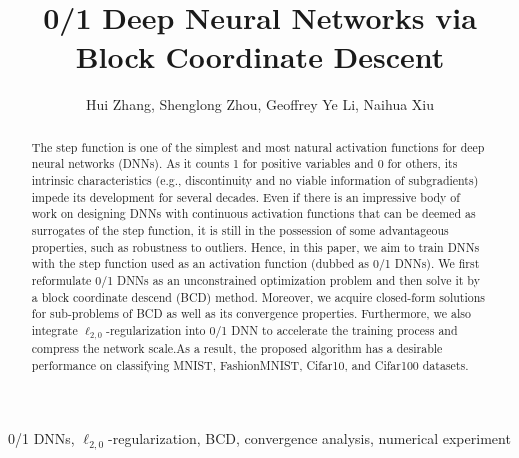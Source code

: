 \documentclass[journal]{IEEEtran}
\begin{document}
\title{\huge 0/1 Deep Neural Networks via Block Coordinate Descent
}





\author{Hui Zhang, Shenglong Zhou, Geoffrey Ye Li, Naihua Xiu}























\maketitle

\begin{abstract}
The step function is one of the simplest and most natural activation functions for deep neural networks (DNNs). As it counts 1 for positive variables and 0 for others, its intrinsic characteristics (e.g., discontinuity and no viable information of subgradients) impede its development for several decades. Even if there is an impressive body of work on designing DNNs with continuous activation functions that can be deemed as surrogates of  the step function, it is still in the possession of some advantageous properties, such as robustness to outliers. Hence,  in this paper, we aim to train DNNs with the step function used as an activation function (dubbed as 0/1 DNNs). We first reformulate 0/1 DNNs as an unconstrained optimization problem and then solve it by a  block coordinate descend (BCD) method. Moreover, we acquire closed-form solutions for sub-problems of BCD as well as its convergence properties. Furthermore, we also integrate $\ell_{2,0}$-regularization into 0/1 DNN to accelerate the training process and compress the network scale.As a result, the proposed algorithm has a desirable performance on classifying MNIST, FashionMNIST, Cifar10, and Cifar100 datasets.
\end{abstract}
\begin{IEEEkeywords}
0/1 DNNs,  $\ell_{2,0}$-regularization,  BCD,  convergence analysis,  numerical experiment
\end{IEEEkeywords}
\end{document}

